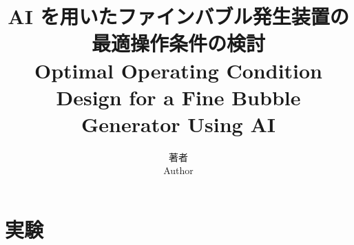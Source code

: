 \documentclass[onecolumn,a4paper,dvipdfmx]{ieicejsp}
\title{
    {\bf AI を用いたファインバブル発生装置の最適操作条件の検討}
    {\normalsize \\ Optimal Operating Condition Design for a Fine Bubble Generator Using AI }
}
\author{
    著者 \\ Author
}
\begin{document}
\maketitle

\section{実験}
\label{sec_experiment}





\end{document}
